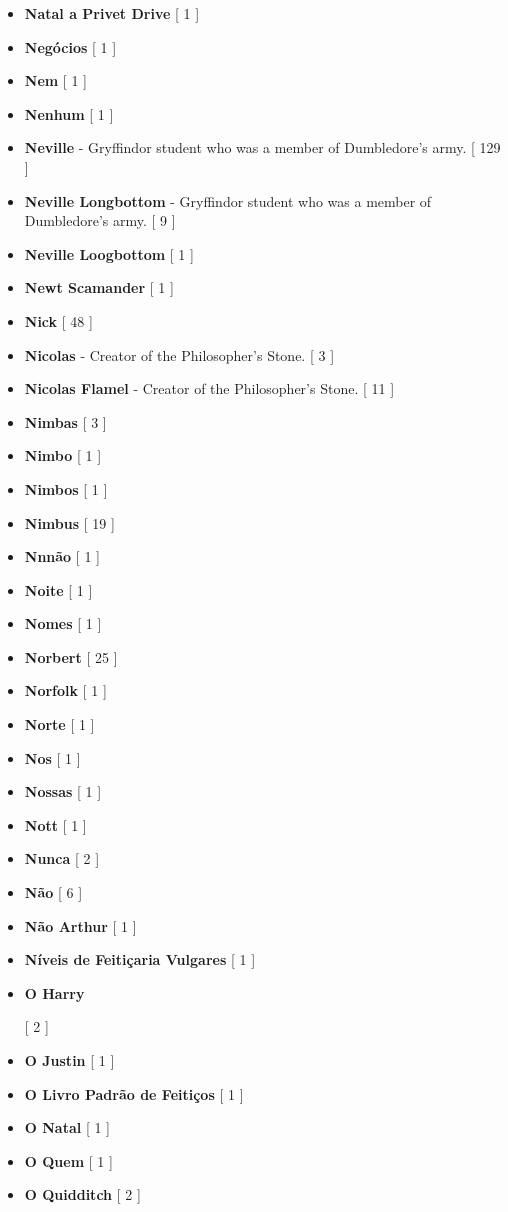 \documentclass[a4paper]{article}
\begin{document}
{\begin{itemize}
	\item \textbf{Natal a Privet Drive} [ 1 ]
	\item \textbf{Negócios} [ 1 ]
	\item \textbf{Nem} [ 1 ]
	\item \textbf{Nenhum} [ 1 ]
	\item \textbf{Neville} - Gryffindor student who was a member of Dumbledore's army. [ 129 ]
	\item \textbf{Neville Longbottom} - Gryffindor student who was a member of Dumbledore's army. [ 9 ]
	\item \textbf{Neville Loogbottom} [ 1 ]
	\item \textbf{Newt Scamander} [ 1 ]
	\item \textbf{Nick} [ 48 ]
	\item \textbf{Nicolas} - Creator of the Philosopher's Stone. [ 3 ]
	\item \textbf{Nicolas Flamel} - Creator of the Philosopher's Stone. [ 11 ]
	\item \textbf{Nimbas} [ 3 ]
	\item \textbf{Nimbo} [ 1 ]
	\item \textbf{Nimbos} [ 1 ]
	\item \textbf{Nimbus} [ 19 ]
	\item \textbf{Nnnão} [ 1 ]
	\item \textbf{Noite} [ 1 ]
	\item \textbf{Nomes} [ 1 ]
	\item \textbf{Norbert} [ 25 ]
	\item \textbf{Norfolk} [ 1 ]
	\item \textbf{Norte} [ 1 ]
	\item \textbf{Nos} [ 1 ]
	\item \textbf{Nossas} [ 1 ]
	\item \textbf{Nott} [ 1 ]
	\item \textbf{Nunca} [ 2 ]
	\item \textbf{Não} [ 6 ]
	\item \textbf{Não Arthur} [ 1 ]
	\item \textbf{Níveis de Feitiçaria Vulgares} [ 1 ]
	\item \hypertarget{O}{\textbf{O Harry}} [ 2 ]
	\item \textbf{O Justin} [ 1 ]
	\item \textbf{O Livro Padrão de Feitiços} [ 1 ]
	\item \textbf{O Natal} [ 1 ]
	\item \textbf{O Quem} [ 1 ]
	\item \textbf{O Quidditch} [ 2 ]

\end{itemize}}
\end{document}
